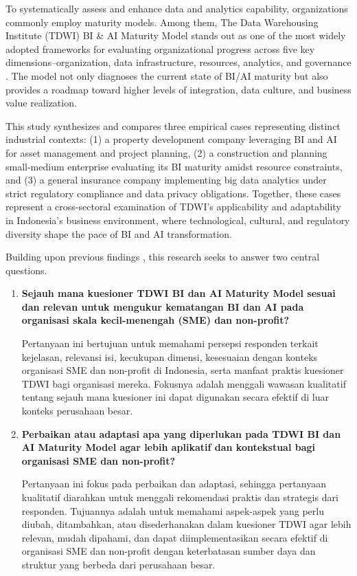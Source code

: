 \documentclass[conference]{IEEEtran}
\begin{document}
To systematically assess and enhance data and analytics capability, organizations commonly employ maturity models. Among them, The Data Warehousing Institute (TDWI) BI \& AI Maturity Model stands out as one of the most widely adopted frameworks for evaluating organizational progress across five key dimensions--organization, data infrastructure, resources, analytics, and governance \cite{tdwi2020}. The model not only diagnoses the current state of BI/AI maturity but also provides a roadmap toward higher levels of integration, data culture, and business value realization.

This study synthesizes and compares three empirical cases representing distinct industrial contexts: (1) a property development company leveraging BI and AI for asset management and project planning, (2) a construction and planning small-medium enterprise evaluating its BI maturity amidst resource constraints, and (3) a general insurance company implementing big data analytics under strict regulatory compliance and data privacy obligations. Together, these cases represent a cross-sectoral examination of TDWI's applicability and adaptability in Indonesia's business environment, where technological, cultural, and regulatory diversity shape the pace of BI and AI transformation.

Building upon previous findings \cite{becker2009developing, boudreau2005contextualization}, this research seeks to answer two central questions. \begin{enumerate}
		\item[\textbf{RQ1}] \textbf{Sejauh mana kuesioner TDWI BI dan AI Maturity Model sesuai dan relevan untuk mengukur kematangan BI dan AI pada organisasi skala kecil-menengah (SME) dan non-profit?}
		
		Pertanyaan ini bertujuan untuk memahami persepsi responden terkait kejelasan, relevansi isi, kecukupan dimensi, kesesuaian dengan konteks organisasi SME dan non-profit di Indonesia, serta manfaat praktis kuesioner TDWI bagi organisasi mereka. Fokusnya adalah menggali wawasan kualitatif tentang sejauh mana kuesioner ini dapat digunakan secara efektif di luar konteks perusahaan besar.
		
		\item[\textbf{RQ2}] \textbf{Perbaikan atau adaptasi apa yang diperlukan pada TDWI BI dan AI Maturity Model agar lebih aplikatif dan kontekstual bagi organisasi SME dan non-profit?}
		
		Pertanyaan ini fokus pada perbaikan dan adaptasi, sehingga pertanyaan kualitatif diarahkan untuk menggali rekomendasi praktis dan strategis dari responden. Tujuannya adalah untuk memahami aspek-aspek yang perlu diubah, ditambahkan, atau disederhanakan dalam kuesioner TDWI agar lebih relevan, mudah dipahami, dan dapat diimplementasikan secara efektif di organisasi SME dan non-profit dengan keterbatasan sumber daya dan struktur yang berbeda dari perusahaan besar.
	\end{enumerate}
\end{document}
